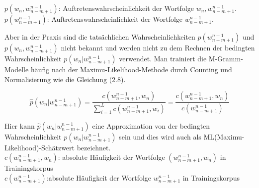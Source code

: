 $p(w_{n},w_{n-m+1}^{n-1})$: Auftretenswahrscheinlichkeit der Wortfolge $w_{n},w_{n-m+1}^{n-1}$.
$p(w_{n-m+1}^{n-1})$: Auftretenswahrscheinlichkeit der Wortfolge $w_{n-m+1}^{n-1}$.


Aber in der Praxis sind die tats\"achlichen Wahrscheinlichkeiten $p(w_{n-m+1}^{n-1})$  und $p(w_{n},w_{n-m+1}^{n-1})$ nicht bekannt und werden nicht zu dem Rechnen der bedingten Wahrscheinlichkeit $p(w_{n}|w_{n-m+1}^{n-1})$ verwendet. Man trainiert die M-Gramm-Modelle h\"aufig nach der Maximu-Likelihood-Methode \cite{int_MLE} durch Counting und Normalisierung wie die Gleichung (2.8). 

\begin{equation}
\hat{p}(w_{n}|w_{n-m+1}^{n-1})=\frac{c(w_{n-m+1}^{n-1},w_{n} )}{ \sum_{i=1}^L c(w_{n-m+1}^{n-1},w_{i})}=\frac{c(w_{n-m+1}^{n-1},w_{n} )}{c(w_{n-m+1}^{n-1})}
\end{equation}

Hier kann $\hat{p}(w_{n}|w_{n-m+1}^{n-1})$  eine Approximation von der bedingten Wahrscheinlichkeit $p(w_{n}|w_{n-m+1}^{n-1})$ sein und dies wird auch als ML(Maximu-Likelihood)-Sch\"atzwert bezeichnet.\\
$c(w_{n-m+1}^{n-1},w_{n})$: absolute H\"aufigkeit der Wortfolge $(w_{n-m+1}^{n-1},w_{n})$ in Trainingskorpus\\
$c(w_{n-m+1}^{n-1})$:absolute H\"aufigkeit der Wortfolge $w_{n-m+1}^{n-1}$ in Trainingskorpus\\

